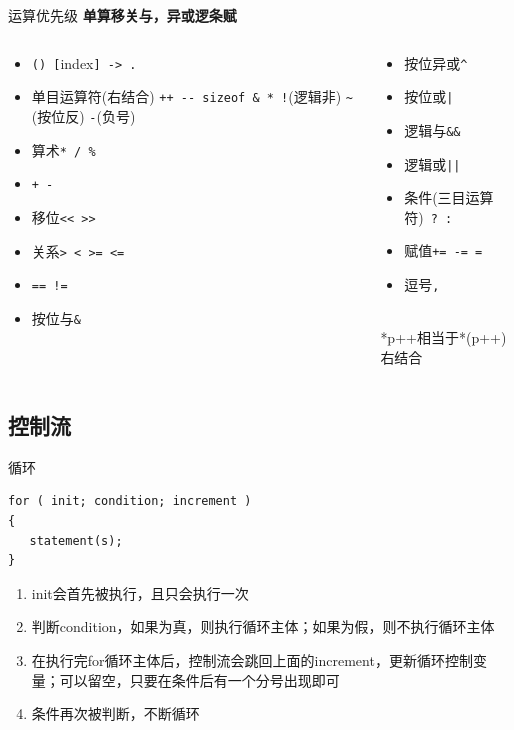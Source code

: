 \documentclass{myslide}
\begin{document}
\begin{frame}[fragile]{运算优先级}
{\Large\textbf{单算移关与，异或逻条赋}}
\begin{columns}
\begin{column}{0.5\linewidth}
\begin{itemize}
	\item \verb'() ['index\verb'] -> .'
	\item 单目运算符(右结合) \verb'++ -- sizeof & * !'(逻辑非) \verb'~'(按位反) \verb'-'(负号)
	\item 算术\verb'* / %'
	\item \verb'+ -'
	\item 移位\verb'<< >>'
	\item 关系\verb'> < >= <='
	\item \verb'== !='
	\item 按位与\verb'&'
\end{itemize}
\end{column}
\begin{column}{0.5\linewidth}
\begin{itemize}
	\item 按位异或\verb'^'
	\item 按位或\verb'|'
	\item 逻辑与\verb'&&'
	\item 逻辑或\verb'||'
	\item 条件(三目运算符)\verb' ? :' 
	\item 赋值\verb'+= -= ='
	\item 逗号\verb','
\end{itemize}
\quad\\
*p++相当于*(p++)右结合
\end{column}
\end{columns}
\end{frame}

\subsection{控制流}
\begin{frame}
\subsectionpage
\end{frame}

\begin{frame}[fragile]{循环}
\begin{lstlisting}
for ( init; condition; increment )
{
   statement(s);
}
\end{lstlisting}
\begin{enumerate}[<+->]
	\item init会首先被执行，且只会执行一次
	\item 判断condition，如果为真，则执行循环主体；如果为假，则不执行循环主体
	\item 在执行完for循环主体后，控制流会跳回上面的increment，更新循环控制变量；可以留空，只要在条件后有一个分号出现即可
	\item 条件再次被判断，不断循环
\end{enumerate}
\end{frame}
\end{document}
